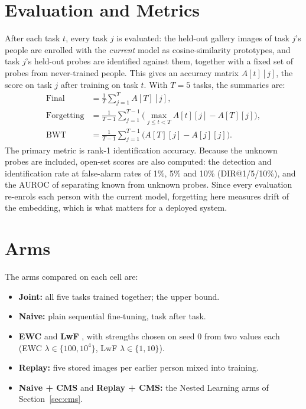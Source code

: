 \documentclass[12pt,a4paper]{report}
\begin{document}
\section{Evaluation and Metrics}\label{sec:metrics}
After each task $t$, every task $j$ is evaluated: the held-out gallery images of task $j$'s people are enrolled with the \emph{current} model as cosine-similarity prototypes, and task $j$'s held-out probes are identified against them, together with a fixed set of probes from never-trained people. This gives an accuracy matrix $A[t][j]$, the score on task $j$ after training on task $t$. With $T = 5$ tasks, the summaries are:
\begin{align}
\text{Final} &= \frac{1}{T}\sum_{j=1}^{T} A[T][j], \\
\text{Forgetting} &= \frac{1}{T-1}\sum_{j=1}^{T-1} \Big(\max_{j \le t < T} A[t][j] - A[T][j]\Big), \label{eq:forgetting}\\
\text{BWT} &= \frac{1}{T-1}\sum_{j=1}^{T-1} \big(A[T][j] - A[j][j]\big).
\end{align}
The primary metric is rank-1 identification accuracy. Because the unknown probes are included, open-set scores are also computed: the detection and identification rate at false-alarm rates of 1\%, 5\% and 10\% (DIR@1/5/10\%), and the AUROC of separating known from unknown probes. Since every evaluation re-enrols each person with the current model, forgetting here measures drift of the embedding, which is what matters for a deployed system.

\section{Arms}
The arms compared on each cell are:
\begin{itemize}
\item \textbf{Joint:} all five tasks trained together; the upper bound.
\item \textbf{Naive:} plain sequential fine-tuning, task after task.
\item \textbf{EWC} \cite{kirkpatrick2017ewc} and \textbf{LwF} \cite{li2017lwf}, with strengths chosen on seed 0 from two values each (EWC $\lambda \in \{100, 10^4\}$, LwF $\lambda \in \{1, 10\}$).
\item \textbf{Replay:} five stored images per earlier person mixed into training.
\item \textbf{Naive + CMS} and \textbf{Replay + CMS:} the Nested Learning arms of Section~\ref{sec:cms}.
\end{itemize}
\end{document}
